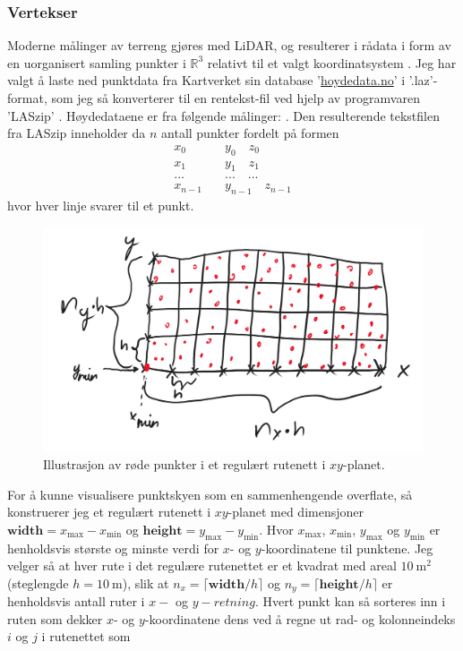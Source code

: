 \documentclass[norsk, doc, 11pt, a4paper]{apa7}  %
\newcommand{\R}{\mathbb{R}}
\begin{document}
\subsubsection{Vertekser} \label{M:1:1}
Moderne målinger av terreng gjøres med LiDAR, og resulterer i rådata i form av en uorganisert samling punkter i \(\R^{3}\) relativt til et valgt koordinatsystem \parencite{bergerSurveySurfaceReconstruction2017}. Jeg har valgt å laste ned punktdata fra Kartverket sin database '\url{hoydedata.no}' i '.laz'-format, som jeg så konverterer til en rentekst-fil ved hjelp av programvaren 'LASzip' \parencite{isenburgLASzip2019}. Høydedataene er fra følgende målinger: \parencite{HoydedataNDHEngerdal2018, HoydedataNDHEngerdal2018a, HoydedataNDHTrysil2018}. Den resulterende tekstfilen fra LASzip inneholder da \(n\) antall punkter fordelt på formen
\begin{align*}
 x_{0} \quad &y_{0} \quad z_{0} \\
 x_{1} \quad &y_{1} \quad z_{1} \\
 ... \quad &... \quad ... \\
 x_{n-1} \quad &y_{n-1} \quad z_{n-1}
\end{align*}
hvor hver linje svarer til et punkt.
\begin{figure}[H]
	\centering
	\includegraphics[width = .4\textwidth]{figs/PointGrid.png}
	\caption{Illustrasjon av røde punkter i et regulært rutenett i \(xy\)-planet.}
\end{figure}
For å kunne visualisere punktskyen som en sammenhengende overflate, så konstruerer jeg et regulært rutenett i \(xy\)-planet med dimensjoner \(\textbf{width} = x_{\text{max}} - x_{\text{min}}\) og \(\textbf{height} = y_{\text{max}} - y_{\text{min}}\). Hvor \(x_{\text{max}}\), \(x_{\text{min}}\), \(y_{\text{max}}\) og \(y_{\text{min}}\) er henholdsvis største og minste verdi for \(x\)- og \(y\)-koordinatene til punktene. Jeg velger så at hver rute i det regulære rutenettet er et kvadrat med areal \(\SI{10}{\metre\squared}\) (steglengde \(h = \SI{10}{\metre}\)), slik at \(n_{x} = \lceil \textbf{width}/h \rceil\) og \(n_{y} = \lceil \textbf{height}/h \rceil\) er henholdsvis antall ruter i \(x-\) og \(y-retning\). Hvert punkt kan så sorteres inn i ruten som dekker \(x\)- og \(y\)-koordinatene dens ved å regne ut rad- og kolonneindeks \(i\) og \(j\) i rutenettet som
\end{document}
